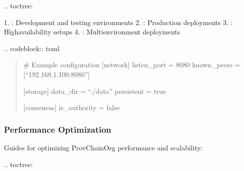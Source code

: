\documentclass[letterpaper,10pt,english]{sphinxmanual}
\begin{document}
\sphinxAtStartPar
{}
.. toctree:

\begin{sphinxVerbatim}[commandchars=\\\{\}]
 
  

\end{sphinxVerbatim}

\sphinxAtStartPar
{}
1. : Development and testing environments
2. : Production deployments
3. : High\sphinxhyphen{}availability setups
4. : Multi\sphinxhyphen{}environment deployments

\sphinxAtStartPar
{}
.. code\sphinxhyphen{}block:: toml
\begin{quote}

\sphinxAtStartPar
\# Example configuration
{[}network{]}
listen\_port = 8080
known\_peers = {[}“192.168.1.100:8080”{]}

\sphinxAtStartPar
{[}storage{]}
data\_dir = “./data”
persistent = true

\sphinxAtStartPar
{[}consensus{]}
is\_authority = false
\end{quote}


\subsubsection{Performance Optimization}
\label{\detokenize{developer/index:performance-optimization}}
\sphinxAtStartPar
Guides for optimizing ProvChainOrg performance and scalability:

\sphinxAtStartPar
{}
.. toctree:

\begin{sphinxVerbatim}[commandchars=\\\{\}]
 
  

\end{sphinxVerbatim}
\end{document}
